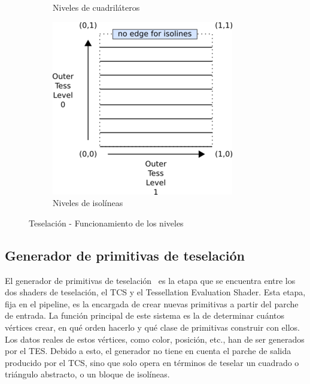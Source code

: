 \begin{figure}[t]
\begin{subfigure}{.45\textwidth}
		\caption{Niveles de cuadriláteros}
	\end{subfigure}
	\par\bigskip \par\bigskip \par\bigskip
	\begin{subfigure}{.45\textwidth}
		\includegraphics[width=\textwidth]{figures/300px-Tessellation_isoline.png}	
		\caption{Niveles de isolíneas}
	\end{subfigure}
	\label{fig:tesselationlevels}	
	\caption{Teselación - Funcionamiento de los niveles}
\end{figure}

\subsection{Generador de primitivas de teselación}
\label{ref:TesPriGen}

El generador de primitivas de teselación~\cite{TesPriGen} es la etapa que se
encuentra entre los dos shaders de teselación, el TCS y el Tessellation
Evaluation Shader. Esta etapa, fija en el pipeline, es la encargada de crear
nuevas primitivas a partir del parche de entrada. La función principal de este
sistema es la de determinar cuántos vértices crear, en qué orden hacerlo y qué
clase de primitivas construir con ellos. Los datos reales de estos vértices,
como color, posición, etc., han de ser generados por el TES. Debido a esto, el
generador no tiene en cuenta el parche de salida producido por el TCS, sino que
solo opera en términos de teselar un cuadrado o triángulo abstracto, o un bloque
de isolíneas.\\

